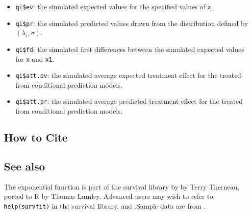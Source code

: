 \begin{itemize}
   \begin{itemize}
   \item {\tt qi\$ev}: the simulated expected values for the specified
     values of {\tt x}.
   \item {\tt qi\$pr}: the simulated predicted values drawn from the
     distribution defined by $(\lambda_i, \sigma)$.
   \item {\tt qi\$fd}: the simulated first differences between the
     simulated expected values for {\tt x} and {\tt x1}.
   \item {\tt qi\$att.ev}: the simulated average expected treatment
     effect for the treated from conditional prediction models.  
   \item {\tt qi\$att.pr}: the simulated average predicted treatment
     effect for the treated from conditional prediction models.  
   \end{itemize}
\end{itemize}

\subsection* {How to Cite} 




\subsection* {See also}
The exponential function is part of the survival library by by Terry
Therneau, ported to R by Thomas Lumley. Advanced users may wish to
refer to \texttt{help(survfit)} in the survival library, 
and \cite{VenRip02}.Sample data are from \cite{KinAltBur90}.
